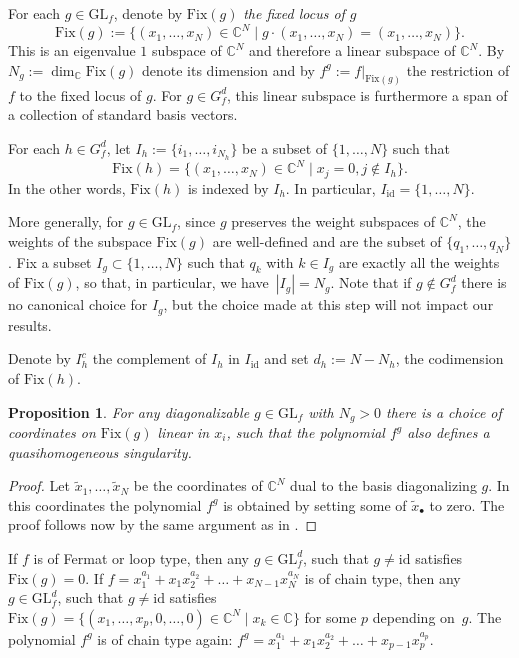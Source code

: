 \documentclass[pdftex]{sigma}
\numberwithin{equation}{section}
\newtheorem{Proposition}[Theorem]{Proposition}
 { \theoremstyle{definition}
\newtheorem{Definition}[Theorem]{Definition}
\newtheorem{Note}[Theorem]{Note}
\newtheorem{Example}[Theorem]{Example}
\newtheorem{Remark}[Theorem]{Remark} }
\newcommand{\CC}{{\mathbb{C}}}
\newcommand{\GL}{{\mathrm{GL}}}
\newcommand{\Fix}{\mathrm{Fix}}
\newcommand{\id}{\mathrm{id}}
\begin{document}
For each $g\in \GL_f$, denote by $\Fix(g)$ \textit{the fixed locus of $g$}
\begin{equation*}
 	\Fix(g):=\bigl\lbrace (x_1,\dots,x_N) \in\CC^N \mid g \cdot (x_1,\dots,x_N) = (x_1,\dots,x_N) \bigr\rbrace.
\end{equation*}
This is an eigenvalue $1$ subspace of $\CC^N$ and therefore a linear subspace of $\CC^N$.
By $N_g:=\dim_\CC\Fix(g)$ denote its dimension and by $f^g:=f|_{\Fix(g)}$ the restriction of $f$ to the fixed locus of $g$.
For $g\in G_f^d$, this linear subspace is furthermore a span of a collection of standard basis vectors.

For each $h\in G_f^d$, let $I_h := \{i_1,\dots,i_{N_h}\}$ be a subset of $\{1,\dots, N\}$ such that
\[
\Fix(h)=\bigl\{(x_1,\dots,x_N)\in\CC^N\mid x_{j}=0, j\notin I_h\bigr\}.
\]
In the other words, $\Fix(h)$ is indexed by $I_h$.
In particular, $I_{\id}=\{1,\dots, N\}$.

More generally, for $g\in \GL_f$, since $g$ preserves the weight subspaces of $\CC^N$, the weights of the subspace $\Fix(g)$ are well-defined and are the subset of $\{q_1,\ldots,q_N\}$. Fix a subset ${I_g\subset \{1,\ldots,N\}}$ such that $q_k$ with $k\in I_g$ are exactly all the weights of $\Fix(g)$, so that, in particular, we have~${|I_g|=N_g}$. Note that if $g\not\in G_f^d$ there is no canonical choice for $I_g$, but the choice made at this step will not impact our results.

Denote by $I_h^c$ the complement of $I_h$ in $I_\id$ and set $d_h:=N-N_h$, the codimension of $\Fix(h)$.

\begin{Proposition}
	For any diagonalizable $g \in \GL_f$ with $N_g > 0$ there is a choice of coordinates on $\Fix(g)$ linear in $x_i$, such that the polynomial $f^g$ also defines a quasihomogeneous singularity.
\end{Proposition}
\begin{proof}
	Let $\widetilde x_1,\dots, \widetilde x_N$ be the coordinates of $\CC^N$ dual to the basis diagonalizing $g$. In this coordinates the polynomial $f^g$ is obtained by setting some of $\widetilde x_\bullet$ to zero. The proof follows now by the same argument as in \cite[Proposition~5]{ET13}.
\end{proof}

\begin{Example}
If $f$ is of Fermat or loop type, then any $g \in \GL_f^d$, such that $g \neq \id$ satisfies $\Fix(g) = 0$.
If $f = x_1^{a_1} + x_1x_2^{a_2} + \dots +x_{N-1}x_N^{a_N}$ is of chain type, then any $g \in \GL_f^d$, such that $g \neq \id$ satisfies
$\Fix(g) = \bigl\lbrace (x_1,\dots,x_p,0,\dots,0) \in \CC^N \mid x_k \in \CC \bigr\rbrace$ for some $p$ depending on~$g$.
The polynomial $f^g$ is of chain type again: $f^g = x_1^{a_1} + x_1x_2^{a_2} + \dots +x_{p-1}x_p^{a_p}$.
\end{Example}
\end{document}
